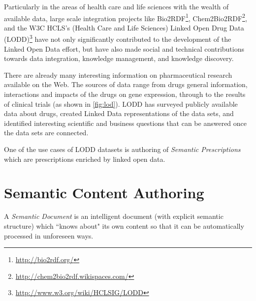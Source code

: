 \documentclass[10pt, conference, compsocconf]{IEEEtran}
\begin{document}
Particularly in the areas of health care and life sciences with the wealth of available data, large scale integration projects like Bio2RDF\footnote{\url{http://bio2rdf.org/}}, Chem2Bio2RDF\footnote{\url{http://chem2bio2rdf.wikispaces.com/}}, and the W3C HCLS’s (Health Care and Life Sciences) Linked Open Drug Data (LODD)\footnote{\url{http://www.w3.org/wiki/HCLSIG/LODD}} have not only significantly contributed to the development of the Linked Open Data effort, but have also made social and technical contributions towards data integration, knowledge management, and knowledge discovery.

There are already many interesting information on pharmaceutical research available on the Web.
The sources of data range from drugs general information, interactions and impacts of the drugs on gene expression, through to the results of clinical trials (as shown in \autoref{fig:lod}).
LODD\cite{lodrug} has surveyed publicly available data about drugs, created Linked Data representations of the data sets, and identified interesting scientific and business questions that can be answered once the data sets are connected.

One of the use cases of LODD datasets is authoring of \emph{Semantic Prescriptions} which are prescriptions enriched by linked open data.

\section{Semantic Content Authoring}
\label{sec:sca}
 A \emph{Semantic Document} is an intelligent document (with explicit semantic structure) which ``knows about" its own content so that it can be automatically processed in unforeseen ways.
\end{document}
